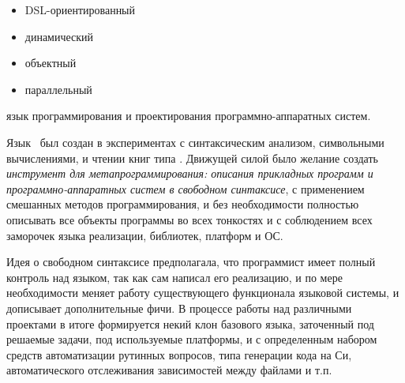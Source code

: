 

\begin{itemize}[nosep]
\item DSL-ориентированный
\item динамический
\item объектный
\item параллельный
\end{itemize}

язык программирования и проектирования программно-аппаратных систем.

\bigskip
Язык \bi\ был создан в экспериментах с синтаксическим анализом, символьными
вычислениями, и чтении книг типа \cite{sicp,dragon,st}. Движущей силой было
желание создать \emph{инструмент для метапрограммирования: описания прикладных 
программ и программно-аппаратных систем в свободном синтаксисе}, с применением
смешанных методов программирования, и без необходимости полностью описывать все 
объекты программы во всех тонкостях и с соблюдением всех заморочек языка
реализации, библиотек, платформ и ОС.

Идея о свободном синтаксисе предполагала, что программист имеет полный контроль
над языком, так как сам написал его реализацию, и по мере необходимости меняет 
работу существующего функционала языковой системы, и дописывает дополнительные
фичи. В процессе работы над различными проектами в итоге формируется некий клон
базового языка, заточенный под решаемые задачи, под используемые платформы, и с 
определенным набором средств автоматизации рутинных вопросов, типа генерации 
кода на Си, автоматического отслеживания зависимостей между файлами и т.п.

